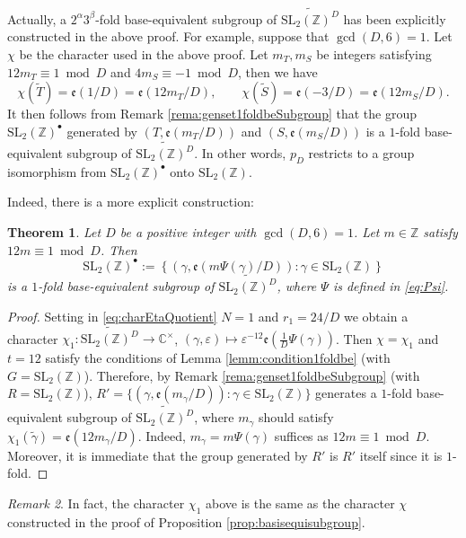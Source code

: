 \documentclass[12pt]{amsart}
\numberwithin{equation}{section}
\theoremstyle{plain}
\newtheorem{thm}{Theorem}[section]
\theoremstyle{definition}
\theoremstyle{remark}
\newtheorem{rema}[thm]{Remark}
\newcommand\etp[1]{\mathfrak{e}\left(#1\right)}
\newcommand\numZ{\mathbb{Z}}
\newcommand\numC{\mathbb{C}}
\newcommand\slZ{\mathrm{SL}_2(\mathbb{Z})}
\newcommand\Dcover[2]{\widetilde{#1^{#2}}}
\begin{document}
\begin{appendix}
Actually, a $2^\alpha3^\beta$-fold base-equivalent subgroup of $\Dcover{\slZ}{D}$ has been explicitly constructed in the above proof. For example, suppose that $\gcd(D,6)=1$. Let $\chi$ be the character used in the above proof. Let $m_T,m_S$ be integers satisfying $12m_T\equiv1\bmod{D}$ and $4m_S\equiv-1\bmod{D}$, then we have
\begin{equation*}
\chi(\widetilde{T})=\etp{1/D}=\etp{12m_T/D},\qquad\chi(\widetilde{S})=\etp{-3/D}=\etp{12m_S/D}.
\end{equation*}
It then follows from Remark \ref{rema:genset1foldbeSubgroup} that the group $\slZ^\bullet$ generated by $(T,\etp{m_T/D})$ and $(S,\etp{m_S/D})$ is a $1$-fold base-equivalent subgroup of $\Dcover{\slZ}{D}$. In other words, $p_D$ restricts to a group isomorphism from $\slZ^\bullet$ onto $\slZ$.

Indeed, there is a more explicit construction:
\begin{thm}
\label{thm:slZbullet}
Let $D$ be a positive integer with $\gcd(D,6)=1$. Let $m\in\numZ$ satisfy $12m\equiv1\bmod{D}$. Then
\begin{equation*}
\slZ^\bullet:=\left\{\left(\gamma,\etp{m\Psi(\gamma)/D}\right)\colon\gamma\in\slZ\right\}
\end{equation*}
is a $1$-fold base-equivalent subgroup of $\Dcover{\slZ}{D}$, where $\Psi$ is defined in \eqref{eq:Psi}.
\end{thm}
\begin{proof}
Setting in \eqref{eq:charEtaQuotient} $N=1$ and $r_1=24/D$ we obtain a character $\chi_1\colon\Dcover{\slZ}{D}\rightarrow\numC^\times$, $(\gamma,\varepsilon)\mapsto\varepsilon^{-12}\etp{\frac{1}{D}\Psi(\gamma)}$. Then $\chi=\chi_1$ and $t=12$ satisfy the conditions of Lemma \ref{lemm:condition1foldbe} (with $G=\slZ$). Therefore, by Remark \ref{rema:genset1foldbeSubgroup} (with $R=\slZ$), $R'=\{(\gamma,\etp{m_\gamma/D})\colon\gamma\in \slZ\}$ generates a $1$-fold base-equivalent subgroup of $\Dcover{\slZ}{D}$, where $m_\gamma$ should satisfy $\chi_1(\widetilde{\gamma})=\etp{12m_\gamma/D}$. Indeed, $m_\gamma=m\Psi(\gamma)$ suffices as $12m\equiv1\bmod{D}$. Moreover, it is immediate that the group generated by $R'$ is $R'$ itself since it is $1$-fold.
\end{proof}
\begin{rema}
In fact, the character $\chi_1$ above is the same as the character $\chi$ constructed in the proof of Proposition \ref{prop:basisequisubgroup}.
\end{rema}


\end{appendix}
\end{document}
